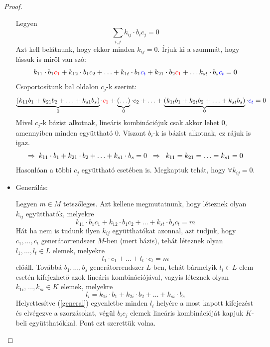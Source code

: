 \documentclass[12pt]{book}
\theoremstyle{plain} %
\theoremstyle{definition} %
\theoremstyle{remark}
\numberwithin{equation}{section}  %
\begin{document}
\begin{proof}
\begin{itemize}
{			Legyen
			\[ \sum_{i,j} k_{ij} \cdot b_i c_j = 0  \]
			Azt kell belátnunk, hogy ekkor minden $k_{ij}=0$. Írjuk ki a szummát, hogy lássuk is miről van szó:
			\[ k_{11} \cdot b_1 \color{red} c_1 \color{black} + k_{12} \cdot b_1 c_2 + \ldots + k_{1t} \cdot b_1 \color{blue} c_t \color{black} + k_{21} \cdot b_2 \color{red} c_1 \color{black} + \ldots k_{st} \cdot b_s \color{blue} c_t \color{black} = 0\]
			Csoportosítunk bal oldalon $c_j$-k szerint:
			\[ \underbrace{(k_{11} b_1 + k_{21} b_2 + \ldots + k_{s1} b_s)}_{0} \cdot \color{red} c_1 \color{black} + \underbrace{(\ldots)}_{0} \cdot c_2 + \ldots + \underbrace{(k_{1t} b_1 + k_{2t} b_2 + \ldots + k_{st}  b_s)}_{0} \cdot \color{blue} c_t \color{black} = 0 \]
			Mivel $c_j$-k bázist alkotnak, lineáris kombinációjuk csak akkor lehet $0$, amennyiben minden együttható $0$. Viszont $b_i$-k is bázist alkotnak, ez rájuk is igaz.
			\[ \Rightarrow \hspace{1mm} k_{11}\cdot b_1 + k_{21}\cdot b_2 + \ldots + k_{s1} \cdot b_s = 0 \hspace{2mm} \Rightarrow \hspace{2mm} k_{11}=k_{21}=\ldots=k_{s1} = 0  \]
			Hasonlóan a többi $c_j$ együttható esetében is. Megkaptuk tehát, hogy $\forall k_{ij} = 0$.
		}
			\item {Generálás:
				
			Legyen $m\in M$ tetszőleges. Azt kellene megmutatnunk, hogy léteznek olyan $k_{ij}$ együtthatók, melyekre
			\[ k_{11} \cdot b_1  c_1 + k_{12} \cdot b_1 c_2 + \ldots + k_{st} \cdot b_s c_t = m  \]
			Hát ha nem is tudunk ilyen $k_{ij}$ együtthatókat azonnal, azt tudjuk, hogy $c_1,\ldots,c_t$ generátorrendszer $M$-ben (mert bázis), tehát léteznek olyan $l_1,\ldots, l_t \in L$ elemek, melyekre
			\begin{equation}\label{general}
				l_1\cdot c_1 + \ldots + l_t\cdot c_t = m 
			\end{equation}
			előáll. Továbbá $b_1,\ldots, b_s$ generátorrendszer $L$-ben, tehát bármelyik $l_i\in L$ elem esetén kifejezhető azok lineáris kombinációjával, vagyis léteznek olyan $k_{1i},\ldots, k_{si} \in K$ elemek, melyekre
			\[ l_i = k_{1i} \cdot b_1 + k_{2i} \cdot b_2 + \ldots + k_{si} \cdot b_s  \]
			Helyettesítve (\ref{general}) egyenletbe minden $l_i$ helyére a most kapott kifejezést és elvégezve a szorzásokat, végül $b_i c_j$ elemek lineáris kombinációját kapjuk $K$-beli együtthatókkal. Pont ezt szerettük volna.
		}
		\end{itemize}
	\end{proof}
\end{document}
